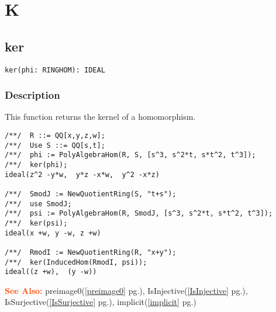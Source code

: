 \documentclass[a4paper]{mybook}
\newenvironment{command}{}{} %
\newcommand\SeeAlso{\par\textcolor{OrangeRed}{\textbf{\large See Also: }}}
\begin{document}
\chapter{K}  %
\label{K}

\section{ker}
\label{ker}
\begin{command} %


\begin{Verbatim}[label=syntax, rulecolor=\color{MidnightBlue},
frame=single]
ker(phi: RINGHOM): IDEAL
\end{Verbatim}


\subsection*{Description}

This function returns the kernel of a homomorphism.
\begin{Verbatim}[label=example, rulecolor=\color{PineGreen}, frame=single]
/**/  R ::= QQ[x,y,z,w];
/**/  Use S ::= QQ[s,t];
/**/  phi := PolyAlgebraHom(R, S, [s^3, s^2*t, s*t^2, t^3]);
/**/  ker(phi);
ideal(z^2 -y*w,  y*z -x*w,  y^2 -x*z)

/**/  SmodJ := NewQuotientRing(S, "t+s");
/**/  use SmodJ;
/**/  psi := PolyAlgebraHom(R, SmodJ, [s^3, s^2*t, s*t^2, t^3]);
/**/  ker(psi);
ideal(x +w, y -w, z +w)

/**/  RmodI := NewQuotientRing(R, "x+y");
/**/  ker(InducedHom(RmodI, psi));
ideal((z +w),  (y -w))
\end{Verbatim}


\SeeAlso %
  preimage0(\ref{preimage0} pg.\pageref{preimage0}), 
    IsInjective(\ref{IsInjective} pg.\pageref{IsInjective}), 
    IsSurjective(\ref{IsSurjective} pg.\pageref{IsSurjective}), 
    implicit(\ref{implicit} pg.\pageref{implicit})
\end{command} %
\end{document}
